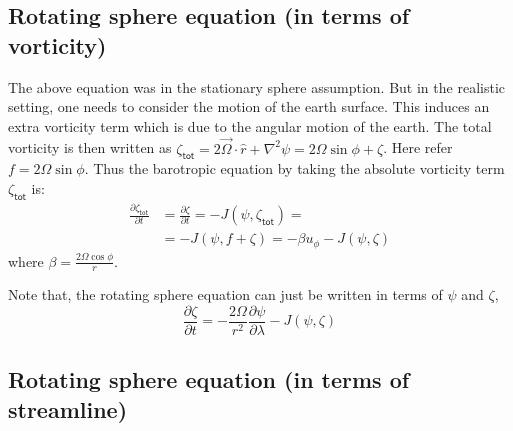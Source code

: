 \documentclass[aps,pra,a4paper,twocolumn,longbibliography,groupedaddress]{revtex4-2}
\begin{document}
\subsection{Rotating sphere equation (in terms of vorticity)}

The above equation was in the stationary sphere assumption. But in the realistic setting, one needs to consider the motion of the earth surface. This induces an extra vorticity term which is due to the angular motion of the earth. The total vorticity is then written as $\zeta_{\textsf{tot}} = 2\vec{\Omega}\cdot\hat{r} + \nabla^2\psi = 2\Omega\sin\phi + \zeta$. Here refer $f = 2\Omega\sin\phi$. Thus the barotropic equation by taking the absolute vorticity term $\zeta_{\textsf{tot}}$ is:
\begin{equation}
    \begin{split}
        \frac{\partial \zeta_{\textsf{tot}}}{\partial t} &= \frac{\partial \zeta}{\partial t} = -J(\psi, \zeta_{\textsf{tot}}) = \\
        & = -J(\psi, f + \zeta) = -\beta u_{\phi} - J(\psi, \zeta)
    \end{split}
    \label{Eq:rotationbaro}
\end{equation}
where $\beta = \frac{2\Omega\cos\phi}{r}$.

Note that, the rotating sphere equation can just be written in terms of $\psi$ and $\zeta$,
\begin{equation}
    \frac{\partial \zeta}{\partial t} = -\frac{2\Omega}{r^2}\frac{\partial \psi}{\partial \lambda} - J(\psi, \zeta)
\end{equation}

\subsection{Rotating sphere equation (in terms of streamline)}
\end{document}

